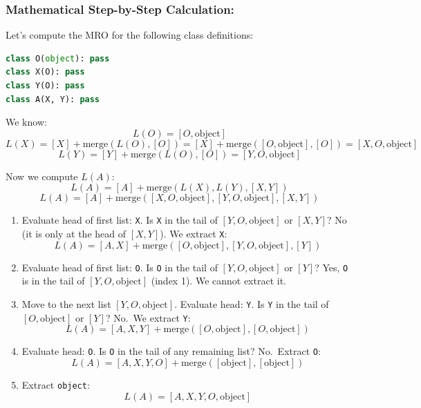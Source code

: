 \hypertarget{mathematical-step-by-step-calculation}{%
\subsubsection{Mathematical Step-by-Step
Calculation:}\label{mathematical-step-by-step-calculation}}

Let's compute the MRO for the following class definitions:

\begin{lstlisting}[language=Python]
class O(object): pass
class X(O): pass
class Y(O): pass
class A(X, Y): pass
\end{lstlisting}

We know: \[L(O) = [O, \text{object}]\]
\[L(X) = [X] + \text{merge}(L(O), [O]) = [X] + \text{merge}([O, \text{object}], [O]) = [X, O, \text{object}]\]
\[L(Y) = [Y] + \text{merge}(L(O), [O]) = [Y, O, \text{object}]\]

Now we compute \(L(A)\):
\[L(A) = [A] + \text{merge}(L(X), L(Y), [X, Y])\]
\[L(A) = [A] + \text{merge}([X, O, \text{object}], [Y, O, \text{object}], [X, Y])\]

\begin{enumerate}
\def\labelenumi{\arabic{enumi}.}
\tightlist
\item
  Evaluate head of first list: \passthrough{\lstinline!X!}. Is
  \passthrough{\lstinline!X!} in the tail of \([Y, O, \text{object}]\)
  or \([X, Y]\)? No (it is only at the head of \([X, Y]\)). We extract
  \passthrough{\lstinline!X!}:
  \[L(A) = [A, X] + \text{merge}([O, \text{object}], [Y, O, \text{object}], [Y])\]
\item
  Evaluate head of first list: \passthrough{\lstinline!O!}. Is
  \passthrough{\lstinline!O!} in the tail of \([Y, O, \text{object}]\)
  or \([Y]\)? Yes, \passthrough{\lstinline!O!} is in the tail of
  \([Y, O, \text{object}]\) (index 1). We cannot extract it.
\item
  Move to the next list \([Y, O, \text{object}]\). Evaluate head:
  \passthrough{\lstinline!Y!}. Is \passthrough{\lstinline!Y!} in the
  tail of \([O, \text{object}]\) or \([Y]\)? No.~We extract
  \passthrough{\lstinline!Y!}:
  \[L(A) = [A, X, Y] + \text{merge}([O, \text{object}], [O, \text{object}])\]
\item
  Evaluate head: \passthrough{\lstinline!O!}. Is
  \passthrough{\lstinline!O!} in the tail of any remaining list?
  No.~Extract \passthrough{\lstinline!O!}:
  \[L(A) = [A, X, Y, O] + \text{merge}([\text{object}], [\text{object}])\]
\item
  Extract \passthrough{\lstinline!object!}:
  \[L(A) = [A, X, Y, O, \text{object}]\]
\end{enumerate}

